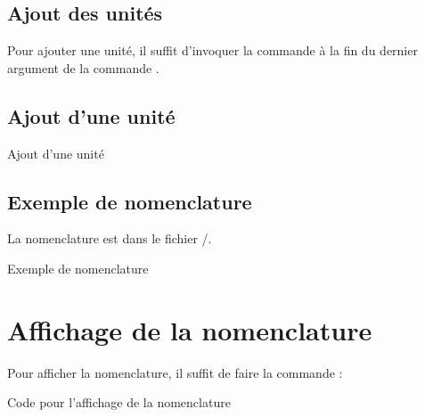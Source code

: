 {\subsection{Ajout des unités}

Pour ajouter une unité, il suffit d'invoquer la commande  à la fin du dernier argument de la commande .

\subsection{Ajout d'une unité}

\begin{Latex}{Ajout d'une unité}
\end{Latex}
    

\subsection{Exemple de nomenclature}

La nomenclature est dans le fichier /.\\

\begin{Latex}{Exemple de nomenclature}

  
\end{Latex}



\section{Affichage de la nomenclature}

Pour afficher la nomenclature, il suffit de faire la commande : \\

\begin{Latex}{Code pour l'affichage de la nomenclature}
\end{Latex}

}
